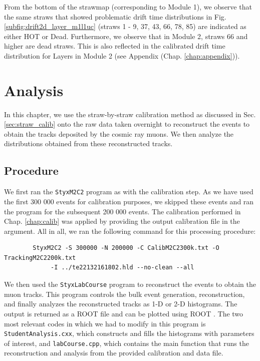 \documentclass[a4paper]{report}
\numberwithin{equation}{section}
\begin{document}
From the bottom of the strawmap (corresponding to Module 1), we observe that the same straws that showed problematic drift time distributions
in Fig. \ref{subfig:drift2d_layer_m1l1uc} (straws 1 - 9, 37, 43, 66, 78, 85) are indicated as either HOT or Dead. Furthermore, 
we observe that in Module 2, straws 66 and higher are dead straws. This is also reflected in the calibrated drift time distribution 
for Layers in Module 2 (see Appendix (Chap. \ref{chap:appendix})). \par 

\chapter{Analysis} \label{chap:track_analysis}

In this chapter, we use the straw-by-straw calibration method as discussed in Sec. \ref{sec:straw_calib} onto the 
raw data taken overnight to reconstruct the events to obtain the tracks deposited by the cosmic ray muons. 
We then analyze the distributions obtained from these reconstructed tracks. \par 

\section{Procedure} \label{sec:analysis_proced}

We first ran the \texttt{StyxM2C2} program as with the calibration step. As we have used the first 300 000 events for 
calibration purposes, we skipped these events and ran the program for the subsequent 200 000 events. The calibration 
performed in Chap. \ref{chap:calib} was applied by providing the output calibration file in the argument. 
All in all, we ran the following command for this processing procedure: 
\begin{tcolorbox}
	\begin{verbatim}
		StyxM2C2 -S 300000 -N 200000 -C CalibM2C2300k.txt -O TrackingM2C2200k.txt
			 -I ../te22132161802.hld --no-clean --all
	\end{verbatim}
\end{tcolorbox}

We then used the \texttt{StyxLabCourse} program to reconstruct the events to obtain the muon tracks. This program controls the 
bulk event generation, reconstruction, and finally analyzes the reconstructed tracks as 1-D or 2-D histograms. 
The output is returned as a ROOT file and can be plotted using ROOT \cite{labman}. The two most relevant codes in which we had 
to modify in this program is \texttt{StudentAnalysis.cxx}, which constructs and fills the histograms with parameters of interest,
and \texttt{labCourse.cpp}, which contains the main function that runs the reconstruction and analysis from the provided 
calibration and data file. \par 
\end{document}
